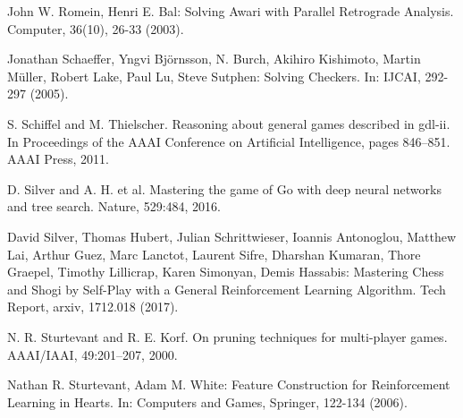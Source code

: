 \documentclass[runningheads]{llncs}
\begin{document}
\begin{thebibliography}{8}
    John W. Romein, Henri E. Bal: Solving Awari with Parallel Retrograde Analysis. Computer, 36(10), 26-33 (2003).

    Jonathan Schaeffer, Yngvi Björnsson, N. Burch, Akihiro Kishimoto, Martin Müller, Robert Lake, Paul Lu, Steve Sutphen: Solving Checkers. In: IJCAI, 292-297 (2005).

    S. Schiffel and M. Thielscher. Reasoning about general games described in gdl-ii. In Proceedings of the AAAI Conference on Artificial Intelligence, pages 846–851. AAAI Press, 2011.

    D. Silver and A. H. et al. Mastering the game of Go with deep neural networks and tree search. Nature, 529:484, 2016.

    David Silver, Thomas Hubert, Julian Schrittwieser, Ioannis Antonoglou, Matthew Lai, Arthur Guez, Marc Lanctot, Laurent Sifre, Dharshan Kumaran, Thore Graepel, Timothy Lillicrap, Karen Simonyan, Demis Hassabis: Mastering Chess and Shogi by Self-Play with a General Reinforcement Learning Algorithm. Tech Report, arxiv, 1712.018 (2017).

    N. R. Sturtevant and R. E. Korf. On pruning techniques for multi-player games. AAAI/IAAI, 49:201–207, 2000.

    Nathan R. Sturtevant, Adam M. White: Feature Construction for Reinforcement Learning in Hearts. In: Computers and Games, Springer, 122-134 (2006).

\end{thebibliography}
\end{document}
